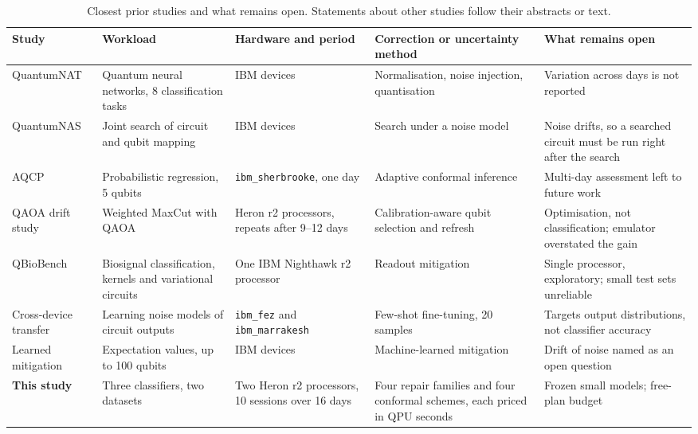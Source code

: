 \documentclass[10pt,conference]{IEEEtran}
\begin{document}
\begin{table}[t]
\centering
\caption{Closest prior studies and what remains open. Statements about other studies follow
their abstracts or text.}
\label{tab:related}
\footnotesize
\setlength{\tabcolsep}{4pt}
\renewcommand{\arraystretch}{1.15}
\begin{tabular}{>{\raggedright\arraybackslash}p{2.5cm}>{\raggedright\arraybackslash}p{3.3cm}>{\raggedright\arraybackslash}p{3.3cm}>{\raggedright\arraybackslash}p{3.2cm}>{\raggedright\arraybackslash}p{3.9cm}}
\toprule
Study & Workload & Hardware and period & Correction or uncertainty method & What remains open \\
\midrule
QuantumNAT \cite{wang2022quantumnat} & Quantum neural networks, 8 classification tasks & 6 IBM devices & Normalisation, noise injection, quantisation & Variation across days is not reported \\
QuantumNAS \cite{wang2022quantumnas} & Joint search of circuit and qubit mapping & IBM devices & Search under a noise model & Noise drifts, so a searched circuit must be run right after the search \\
AQCP \cite{spencer2026aqcp} & Probabilistic regression, 5 qubits & \texttt{ibm\_sherbrooke}, one day & Adaptive conformal inference & Multi-day assessment left to future work \\
QAOA drift study \cite{qaoa2026drift} & Weighted MaxCut with QAOA & 3 Heron r2 processors, repeats after 9--12 days & Calibration-aware qubit selection and refresh & Optimisation, not classification; emulator overstated the gain \\
QBioBench \cite{qbiobench2026} & Biosignal classification, kernels and variational circuits & One IBM Nighthawk r2 processor & Readout mitigation & Single processor, exploratory; small test sets unreliable \\
Cross-device transfer \cite{farib2026crossdevice} & Learning noise models of circuit outputs & \texttt{ibm\_fez} and \texttt{ibm\_marrakesh} & Few-shot fine-tuning, 20 samples & Targets output distributions, not classifier accuracy \\
Learned mitigation \cite{liao2024mlqem} & Expectation values, up to 100 qubits & IBM devices & Machine-learned mitigation & Drift of noise named as an open question \\
\midrule
\textbf{This study} & Three classifiers, two datasets & Two Heron r2 processors, 10 sessions over 16 days & Four repair families and four conformal schemes, each priced in QPU seconds & Frozen small models; free-plan budget \\
\bottomrule
\end{tabular}
\end{table}
\end{document}
